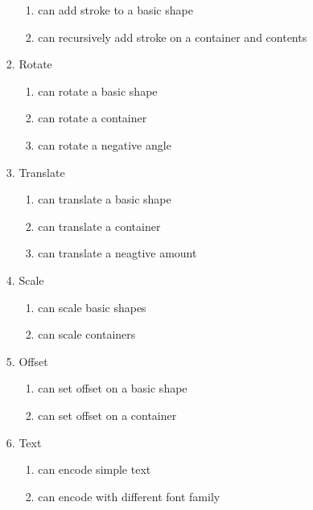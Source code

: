 \begin{enumerate}[{T}1]
\begin{enumerate}
\begin{enumerate}
	        \begin{enumerate}
            	\item can add stroke to a basic shape
            	\item can recursively add stroke on a container and contents
            \end{enumerate}
	        \item Rotate
	        \begin{enumerate}
            	\item can rotate a basic shape
            	\item can rotate a container
            	\item can rotate a negative angle
            \end{enumerate}
	        \item Translate
	        \begin{enumerate}
            	\item can translate a basic shape
            	\item can translate a container
            	\item can translate a neagtive amount
            \end{enumerate}
	        \item Scale
	        \begin{enumerate}
            	\item can scale basic shapes
            	\item can scale containers
            \end{enumerate}
	        \item Offset
	        \begin{enumerate}
            	\item can set offset on a basic shape
            	\item can set offset on a container
            \end{enumerate}
	        \item Text
	        \begin{enumerate}
            	\item can encode simple text
            	\item can encode with different font family

\end{enumerate}
\end{enumerate}
\end{enumerate}
\end{enumerate}

